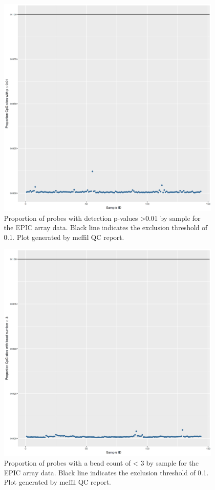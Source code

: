 \documentclass[
]{book}
\begin{document}
\begin{figure}

{\centering \includegraphics[width=0.8\linewidth]{figs/MAVIDOSqcEPICpropSites} 

}

\caption{Proportion of probes with detection p-values \textgreater0.01 by sample for the EPIC array data. Black line indicates the exclusion threshold of 0.1. Plot generated by meffil QC report.}\label{fig:MAVIDOSqcEPICpropSites}
\end{figure}



\begin{figure}

{\centering \includegraphics[width=0.8\linewidth]{figs/MAVIDOSqcEPICbeadNum} 

}

\caption{Proportion of probes with a bead count of \textless{} 3 by sample for the EPIC array data.
Black line indicates the exclusion threshold of 0.1.
Plot generated by meffil QC report.}\label{fig:MAVIDOSqcEPICbeadNum}
\end{figure}
\end{document}
